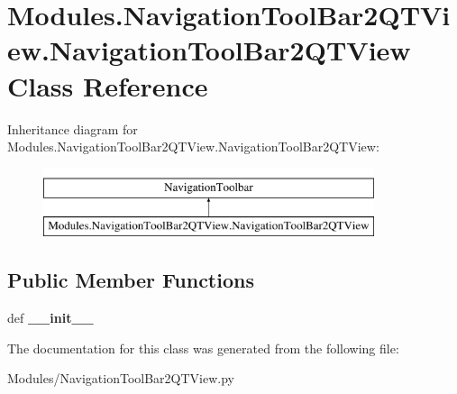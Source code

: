 \hypertarget{classModules_1_1NavigationToolBar2QTView_1_1NavigationToolBar2QTView}{\section{Modules.\-Navigation\-Tool\-Bar2\-Q\-T\-View.\-Navigation\-Tool\-Bar2\-Q\-T\-View Class Reference}
\label{classModules_1_1NavigationToolBar2QTView_1_1NavigationToolBar2QTView}
}
Inheritance diagram for Modules.\-Navigation\-Tool\-Bar2\-Q\-T\-View.\-Navigation\-Tool\-Bar2\-Q\-T\-View\-:\begin{figure}[H]
\begin{center}
\leavevmode
\includegraphics[height=2.000000cm]{classModules_1_1NavigationToolBar2QTView_1_1NavigationToolBar2QTView}
\end{center}
\end{figure}
\subsection*{Public Member Functions}
\begin{DoxyCompactItemize}
\item 
\hypertarget{classModules_1_1NavigationToolBar2QTView_1_1NavigationToolBar2QTView_a62770638b36d2748ca775dc8c9e60d8a}{def {\bfseries \-\_\-\-\_\-init\-\_\-\-\_\-}}\label{classModules_1_1NavigationToolBar2QTView_1_1NavigationToolBar2QTView_a62770638b36d2748ca775dc8c9e60d8a}

\end{DoxyCompactItemize}


The documentation for this class was generated from the following file\-:\begin{DoxyCompactItemize}
\item 
Modules/Navigation\-Tool\-Bar2\-Q\-T\-View.\-py\end{DoxyCompactItemize}
